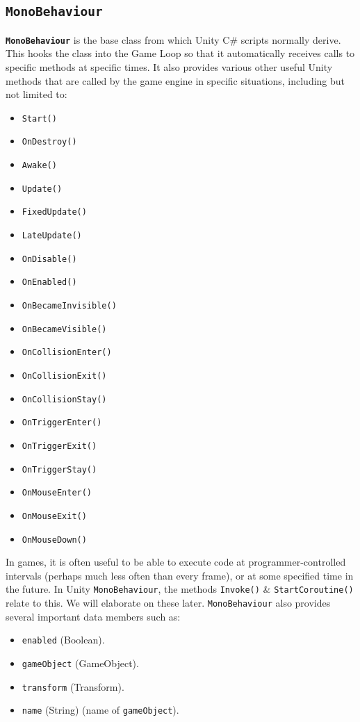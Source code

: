 \documentclass[a4paper,11pt]{article}
\begin{document}
\subsection{\texttt{MonoBehaviour}}
\textbf{\texttt{MonoBehaviour}} is the base class from which Unity C\# scripts normally derive. 
This hooks the class into the Game Loop so that it automatically receives calls to specific methods at specific times. 
It also provides various other useful Unity methods that are called by the game engine in specific situations, including but 
not limited to: 
\begin{multicols}{3}
\begin{itemize}
    \item   \verb|Start()|
    \item   \verb|OnDestroy()|
    \item   \verb|Awake()| 
    \item   \verb|Update()|
    \item   \verb|FixedUpdate()|
    \item   \verb|LateUpdate()|
    \item   \verb|OnDisable()|
    \item   \verb|OnEnabled()|
    \item   \verb|OnBecameInvisible()|
    \item   \verb|OnBecameVisible()|
    \item   \verb|OnCollisionEnter()|
    \item   \verb|OnCollisionExit()|
    \item   \verb|OnCollisionStay()|
    \item   \verb|OnTriggerEnter()|
    \item   \verb|OnTriggerExit()|
    \item   \verb|OnTriggerStay()|
    \item   \verb|OnMouseEnter()|
    \item   \verb|OnMouseExit()|
    \item   \verb|OnMouseDown()|
\end{itemize}
\end{multicols}

In games, it is often useful to be able to execute code at programmer-controlled intervals (perhaps much less often than every 
frame), or at some specified time in the future. 
In Unity \verb|MonoBehaviour|, the methods \verb|Invoke()| \& \verb|StartCoroutine()| relate to this. 
We will elaborate on these later.
\verb|MonoBehaviour| also provides several important data members such as: 
\begin{multicols}{2}
\begin{itemize}
    \item   \verb|enabled| (Boolean).
    \item   \verb|gameObject| (GameObject).
    \item   \verb|transform| (Transform).
    \item   \verb|name| (String) (name of \verb|gameObject|).
\end{itemize}
\end{multicols}
\end{document}
